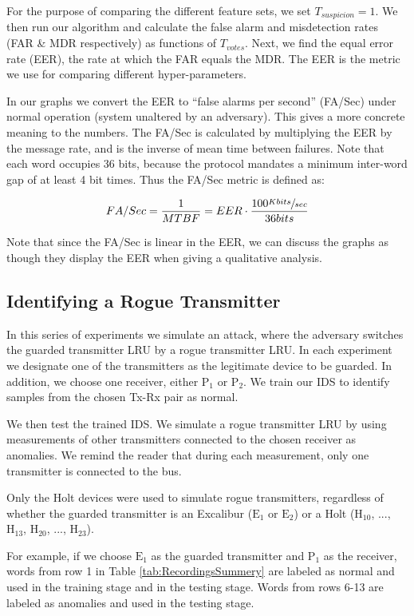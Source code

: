 \documentclass[english]{llncs}
\newcommand{\sublevel}[1]{\subsection{#1}}
\newcommand{\sublevel}[1]{\section{#1}}
\begin{document}
  For the purpose of comparing the different feature sets, we set $T_{suspicion} = 1$. We then run our algorithm and calculate the false alarm and misdetection rates (FAR \& MDR respectively) as functions of $T_{votes}$. Next, we find the equal error rate (EER), the rate at which the FAR equals the MDR. The EER is the metric we use for comparing different hyper-parameters.
  
  In our graphs we convert the EER to ``false alarms per second'' (FA/Sec) under normal operation (system unaltered by an adversary). This gives a more concrete meaning to the numbers. The FA/Sec is calculated by multiplying the EER by the message rate, and is the inverse of mean time between failures. Note that each word occupies 36 bits, because the protocol mandates a minimum inter-word gap of at least 4 bit times. Thus the FA/Sec metric is defined as:
  
  \[FA/Sec = \frac{1}{MTBF} = EER \cdot \frac{100 \sfrac{Kbits}{sec}}{36bits}\]
  
  Note that since the FA/Sec is linear in the EER, we can discuss the graphs as though they display the EER when giving a qualitative analysis.

\vspace*{-1.5ex}  
\sublevel{Identifying a Rogue Transmitter}
\vspace*{-0.5ex}  
  In this series of experiments we simulate an attack, where the adversary switches the guarded transmitter LRU by a rogue transmitter LRU. In each experiment we designate one of the transmitters as the legitimate device to be guarded. In addition, we choose one receiver, either \(\text{P}_1\) or \(\text{P}_2\).  We train our IDS to identify samples from the chosen Tx-Rx pair as normal.
  
  We then test the trained IDS. We simulate a rogue transmitter LRU by using measurements of other transmitters connected to the chosen receiver as anomalies. We remind the reader that during each measurement, only one transmitter is connected to the bus.
  
  Only the Holt devices were used to simulate rogue transmitters, regardless of whether the guarded transmitter is an Excalibur (\(\text{E}_1\) or \(\text{E}_2\)) or a Holt (\(\text{H}_{10}\), ..., \(\text{H}_{13}\), \(\text{H}_{20}\), ..., \(\text{H}_{23}\)).
  
  For example, if we choose \(\text{E}_1\) as the guarded transmitter and \(\text{P}_1\) as the receiver, words from row 1 in Table \ref{tab:RecordingsSummery} are labeled as normal and used in the training stage and in the testing stage. Words from rows 6-13 are labeled as anomalies and used in the testing stage.
  
\end{document}

